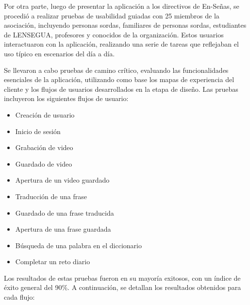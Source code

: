 Por otra parte, luego de presentar la aplicación a los directivos de En-Señas, se procedió a realizar pruebas de usabilidad guiadas con 25 miembros de la asociación, incluyendo personas sordas, familiares de personas sordas, estudiantes de LENSEGUA, profesores y conocidos de la organización. Estos usuarios interactuaron con la aplicación, realizando una serie de tareas que reflejaban el uso típico en escenarios del día a día.

Se llevaron a cabo pruebas de camino crítico, evaluando las funcionalidades esenciales de la aplicación, utilizando como base los mapas de experiencia del cliente y los flujos de usuarios desarrollados en la etapa de diseño. Las pruebas incluyeron los siguientes flujos de usuario:

\begin{itemize}
    \item Creación de usuario
    \item Inicio de sesión
    \item Grabación de video
    \item Guardado de video
    \item Apertura de un video guardado
    \item Traducción de una frase
    \item Guardado de una frase traducida
    \item Apertura de una frase guardada
    \item Búsqueda de una palabra en el diccionario
    \item Completar un reto diario
\end{itemize}


Los resultados de estas pruebas fueron en su mayoría exitosos, con un índice de éxito general del 90\%. A continuación, se detallan los resultados obtenidos para cada flujo:

